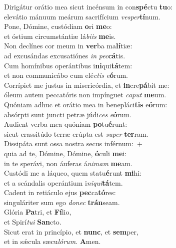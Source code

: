 \evenverse Dirigátur orátio mea sicut incénsum in con\textbf{spé}ctu \textbf{tu}o:~\*\\
\evenverse elevátio mánuum meárum sacrifícium \textit{ve}\textit{sper}\textbf{tí}num.\\
\oddverse Pone, Dómine, custódiam \textbf{o}ri \textbf{me}o:~\*\\
\oddverse et óstium circumstántiæ lá\textit{bi}\textit{is} \textbf{me}is.\\
\evenverse Non declínes cor meum in \textbf{ver}ba ma\textbf{lí}tiæ:~\*\\
\evenverse ad excusándas excusatiónes \textit{in} \textit{pec}\textbf{cá}tis.\\
\oddverse Cum homínibus operántibus i\textbf{ni}qui\textbf{tá}tem:~\*\\
\oddverse et non communicábo cum elé\textit{ctis} \textit{e}\textbf{ó}rum.\\
\evenverse Corrípiet me justus in misericórdia, et \textbf{in}cre\textbf{pá}bit me:~\*\\
\evenverse óleum autem peccatóris non impínguet \textit{ca}\textit{put} \textbf{me}um.\\
\oddverse Quóniam adhuc et orátio mea in benepláci\textbf{tis} e\textbf{ó}rum:~\*\\
\oddverse absórpti sunt juncti petræ júdi\textit{ces} \textit{e}\textbf{ó}rum.\\
\evenverse Audient verba mea quóniam \textbf{po}tu\textbf{é}runt:~\*\\
\evenverse sicut crassitúdo terræ erúpta est \textit{su}\textit{per} \textbf{ter}ram.\\
\oddverse Dissipáta sunt ossa nostra secus inférnum:~+\\
\oddverse  quia ad te, Dómine, Dómine, \textbf{ó}culi \textbf{me}i:~\*\\
\oddverse in te sperávi, non áuferas á\textit{ni}\textit{mam} \textbf{me}am.\\
\evenverse Custódi me a láqueo, quem statu\textbf{é}runt \textbf{mi}hi:~\*\\
\evenverse et a scándalis operántium i\textit{ni}\textit{qui}\textbf{tá}tem.\\
\oddverse Cadent in retiáculo ejus \textbf{pec}ca\textbf{tó}res:~\*\\
\oddverse singuláriter sum ego \textit{do}\textit{nec} \textbf{trán}seam.\\
\evenverse Glória \textbf{Pa}tri, et \textbf{Fí}lio,~\*\\
\evenverse et Spirí\textit{tu}\textit{i} \textbf{San}cto.\\
\oddverse Sicut erat in princípio, et \textbf{nunc}, et \textbf{sem}per,~\*\\
\oddverse et in sǽcula sæcu\textit{ló}\textit{rum}. \textbf{A}men.\\
